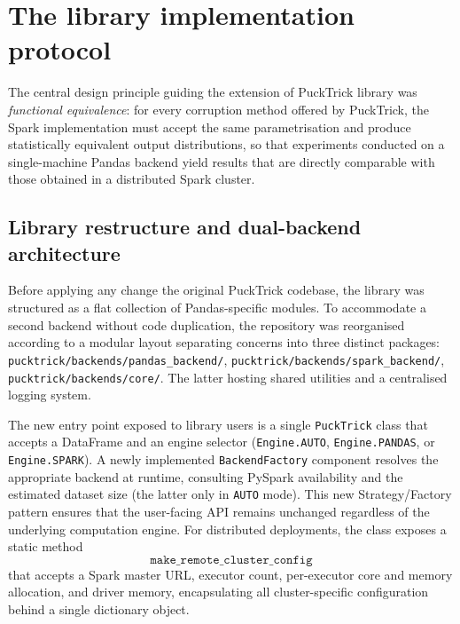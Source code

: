 \documentclass{article}
\begin{document}
\section{The library implementation protocol}
The central design principle guiding the extension of PuckTrick library was \emph{functional equivalence}: for every corruption method offered by PuckTrick, the Spark implementation must accept the same parametrisation and produce statistically equivalent output distributions, so that experiments conducted on a single-machine Pandas backend yield results that are directly comparable with those obtained in a distributed Spark cluster. 

\subsection{Library restructure and dual-backend architecture}

Before applying any change the original PuckTrick codebase, the library was structured as a flat collection of Pandas-specific modules. To accommodate a second backend without code duplication, the repository was reorganised according to a modular layout separating concerns into three distinct packages: \texttt{pucktrick/backends/pandas\_backend/}, \texttt{pucktrick/backends/spark\_backend/}, \texttt{pucktrick/backends/core/}. The latter hosting shared utilities and a centralised logging system.

The new entry point exposed to library users is a single \texttt{PuckTrick} class that accepts a DataFrame and an engine selector (\texttt{Engine.AUTO}, \texttt{Engine.PANDAS}, or \texttt{Engine.SPARK}). A newly implemented \texttt{BackendFactory} component resolves the appropriate backend at runtime, consulting PySpark availability and the estimated dataset size (the latter only in \texttt{AUTO} mode). This new Strategy/Factory pattern ensures that the user-facing API remains unchanged regardless of the underlying computation engine. For distributed deployments, the class exposes a static method $$\texttt{make\_remote\_cluster\_config}$$ that accepts a Spark master URL, executor count, per-executor core and memory allocation, and driver memory, encapsulating all cluster-specific configuration behind a single dictionary object.
\end{document}
